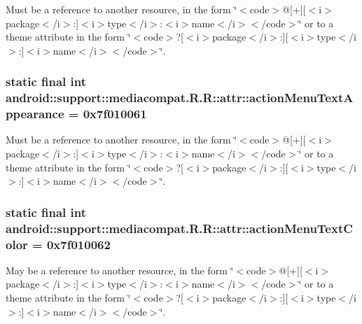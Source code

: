 Must be a reference to another resource, in the form \char`\"{}$<$code$>$@\mbox{[}+\mbox{]}\mbox{[}$<$i$>$package$<$/i$>$:\mbox{]}$<$i$>$type$<$/i$>$:$<$i$>$name$<$/i$>$$<$/code$>$\char`\"{} or to a theme attribute in the form \char`\"{}$<$code$>$?\mbox{[}$<$i$>$package$<$/i$>$:\mbox{]}\mbox{[}$<$i$>$type$<$/i$>$:\mbox{]}$<$i$>$name$<$/i$>$$<$/code$>$\char`\"{}. \hypertarget{classandroid_1_1support_1_1mediacompat_1_1_r_1_1attr_19f497134c2b778364fdb0d67276ce2e}{
\subsubsection[{actionMenuTextAppearance}]{\setlength{\rightskip}{0pt plus 5cm}static final int android::support::mediacompat.R.R::attr::actionMenuTextAppearance = 0x7f010061}}
\label{classandroid_1_1support_1_1mediacompat_1_1_r_1_1attr_19f497134c2b778364fdb0d67276ce2e}


Must be a reference to another resource, in the form \char`\"{}$<$code$>$@\mbox{[}+\mbox{]}\mbox{[}$<$i$>$package$<$/i$>$:\mbox{]}$<$i$>$type$<$/i$>$:$<$i$>$name$<$/i$>$$<$/code$>$\char`\"{} or to a theme attribute in the form \char`\"{}$<$code$>$?\mbox{[}$<$i$>$package$<$/i$>$:\mbox{]}\mbox{[}$<$i$>$type$<$/i$>$:\mbox{]}$<$i$>$name$<$/i$>$$<$/code$>$\char`\"{}. \hypertarget{classandroid_1_1support_1_1mediacompat_1_1_r_1_1attr_873955d2cacbfe501edd864829f69188}{
\subsubsection[{actionMenuTextColor}]{\setlength{\rightskip}{0pt plus 5cm}static final int android::support::mediacompat.R.R::attr::actionMenuTextColor = 0x7f010062}}
\label{classandroid_1_1support_1_1mediacompat_1_1_r_1_1attr_873955d2cacbfe501edd864829f69188}


May be a reference to another resource, in the form \char`\"{}$<$code$>$@\mbox{[}+\mbox{]}\mbox{[}$<$i$>$package$<$/i$>$:\mbox{]}$<$i$>$type$<$/i$>$:$<$i$>$name$<$/i$>$$<$/code$>$\char`\"{} or to a theme attribute in the form \char`\"{}$<$code$>$?\mbox{[}$<$i$>$package$<$/i$>$:\mbox{]}\mbox{[}$<$i$>$type$<$/i$>$:\mbox{]}$<$i$>$name$<$/i$>$$<$/code$>$\char`\"{}. 

